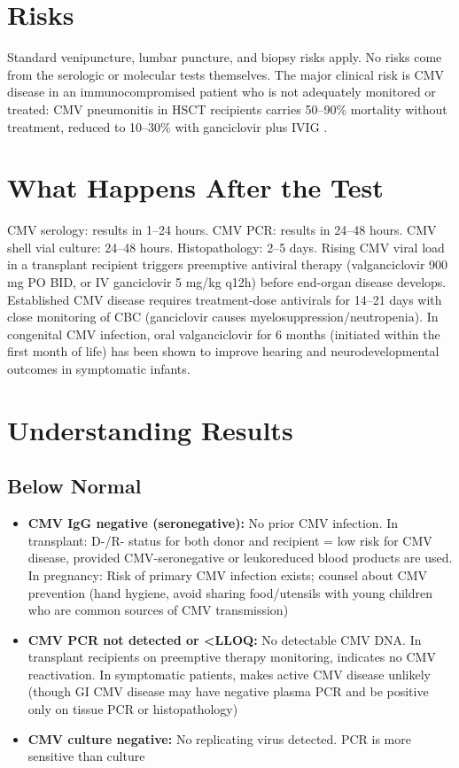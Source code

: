 \section*{Risks}
Standard venipuncture, lumbar puncture, and biopsy risks apply. No risks come from the serologic or molecular tests themselves. The major clinical risk is CMV disease in an immunocompromised patient who is not adequately monitored or treated: CMV pneumonitis in HSCT recipients carries 50--90\% mortality without treatment, reduced to 10--30\% with ganciclovir plus IVIG \cite{ljungman2019guidelines}.

\section*{What Happens After the Test}
CMV serology: results in 1--24 hours. CMV PCR: results in 24--48 hours. CMV shell vial culture: 24--48 hours. Histopathology: 2--5 days. Rising CMV viral load in a transplant recipient triggers preemptive antiviral therapy (valganciclovir 900 mg PO BID, or IV ganciclovir 5 mg/kg q12h) before end-organ disease develops. Established CMV disease requires treatment-dose antivirals for 14--21 days with close monitoring of CBC (ganciclovir causes myelosuppression/neutropenia). In congenital CMV infection, oral valganciclovir for 6 months (initiated within the first month of life) has been shown to improve hearing and neurodevelopmental outcomes in symptomatic infants.

\section*{Understanding Results}

\subsection*{Below Normal}
\begin{itemize}
  \item \textbf{CMV IgG negative (seronegative):} No prior CMV infection. In transplant: D-/R- status for both donor and recipient = low risk for CMV disease, provided CMV-seronegative or leukoreduced blood products are used. In pregnancy: Risk of primary CMV infection exists; counsel about CMV prevention (hand hygiene, avoid sharing food/utensils with young children who are common sources of CMV transmission)
  \item \textbf{CMV PCR not detected or <LLOQ:} No detectable CMV DNA. In transplant recipients on preemptive therapy monitoring, indicates no CMV reactivation. In symptomatic patients, makes active CMV disease unlikely (though GI CMV disease may have negative plasma PCR and be positive only on tissue PCR or histopathology)
  \item \textbf{CMV culture negative:} No replicating virus detected. PCR is more sensitive than culture
\end{itemize}

